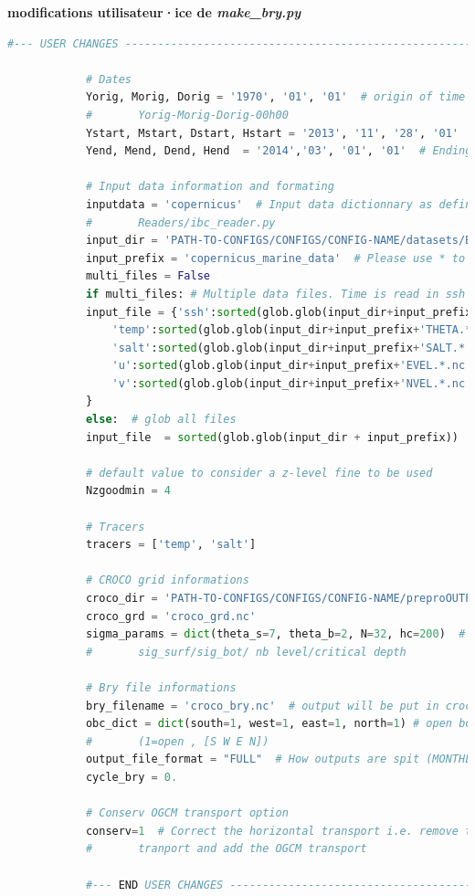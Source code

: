 \documentclass[10pt,a4paper,titlepage]{article}
\begin{document}
    \begin{codeEnv}{\textbf{modifications utilisateur·ice de \textit{make\_bry.py}}}
        \begin{lstlisting}[language=python]
            #--- USER CHANGES ---------------------------------------------------------
            
            # Dates
            Yorig, Morig, Dorig = '1970', '01', '01'  # origin of time as: days since
            #       Yorig-Morig-Dorig-00h00
            Ystart, Mstart, Dstart, Hstart = '2013', '11', '28', '01'  # Starting month
            Yend, Mend, Dend, Hend  = '2014','03', '01', '01'  # Ending month
            
            # Input data information and formating
            inputdata = 'copernicus'  # Input data dictionnary as defined in the
            #       Readers/ibc_reader.py
            input_dir = 'PATH-TO-CONFIGS/CONFIGS/CONFIG-NAME/datasets/Bry/'
            input_prefix = 'copernicus_marine_data'  # Please use * to include all files
            multi_files = False
            if multi_files: # Multiple data files. Time is read in ssh file
            input_file = {'ssh':sorted(glob.glob(input_dir+input_prefix+'ETAN.*.nc')),\
                'temp':sorted(glob.glob(input_dir+input_prefix+'THETA.*.nc')),\
                'salt':sorted(glob.glob(input_dir+input_prefix+'SALT.*.nc')),\
                'u':sorted(glob.glob(input_dir+input_prefix+'EVEL.*.nc')),\
                'v':sorted(glob.glob(input_dir+input_prefix+'NVEL.*.nc'))\
            }
            else:  # glob all files
            input_file  = sorted(glob.glob(input_dir + input_prefix))
            
            # default value to consider a z-level fine to be used
            Nzgoodmin = 4
            
            # Tracers
            tracers = ['temp', 'salt']
            
            # CROCO grid informations
            croco_dir = 'PATH-TO-CONFIGS/CONFIGS/CONFIG-NAME/preproOUTPUT/'
            croco_grd = 'croco_grd.nc'
            sigma_params = dict(theta_s=7, theta_b=2, N=32, hc=200)  # Vertical streching,
            #       sig_surf/sig_bot/ nb level/critical depth
            
            # Bry file informations
            bry_filename = 'croco_bry.nc'  # output will be put in croco_dir by default
            obc_dict = dict(south=1, west=1, east=1, north=1) # open boundaries
            #       (1=open , [S W E N])
            output_file_format = "FULL"  # How outputs are spit (MONTHLY,YEARLY,FULL)
            cycle_bry = 0.
            
            # Conserv OGCM transport option
            conserv=1  # Correct the horizontal transport i.e. remove the integrated
            #       tranport and add the OGCM transport
            
            #--- END USER CHANGES -----------------------------------------------------
        \end{lstlisting}
    \end{codeEnv}
    
\end{document}
